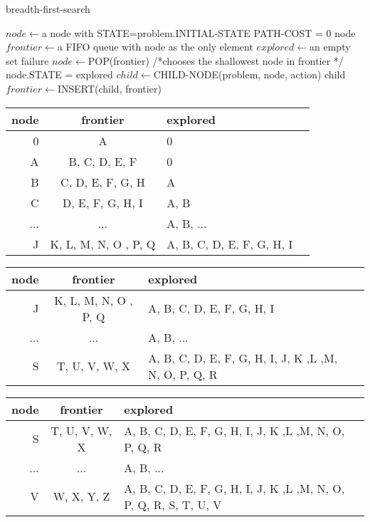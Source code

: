 \documentclass[11pt]{article} %
\begin{document}
\begin{algorithm}
\caption{breadth-first-search }
\begin{algorithmic} 

\STATE $node \leftarrow $a node with STATE=problem.INITIAL-STATE
\STATE PATH-COST = 0
\STATE
\RETURN node
\ENDIF
\STATE $frontier \leftarrow $a FIFO queue with node as the only element
\STATE $explored \leftarrow $an empty set
\LOOP
		\STATE 
		\RETURN failure
	\ENDIF
	\STATE $node \leftarrow $POP(frontier) /*chooses the shallowest node in frontier */
	\STATE node.STATE = explored
	\STATE $child \leftarrow $CHILD-NODE(problem, node, action)
			\STATE
			\RETURN child
		\ENDIF
		\STATE $frontier \leftarrow $INSERT(child, frontier)
	\ENDIF
	\ENDFOR
\ENDLOOP


\end{algorithmic}
\end{algorithm}
\begin{tabularx}{\textwidth}{|r|c|X|X|}
\hline
node & frontier & explored  \\
\hline
0&A&0\\
\hline
A&B, C, D, E, F&0\\
\hline
B&C, D, E, F, G, H&A\\
\hline
C& D, E, F, G, H, I&A, B\\
\hline
...& ...&A, B, ...\\
\hline
J&K, L, M, N, O , P, Q&A, B, C, D, E, F, G, H, I\\
\hline
\end{tabularx}

\begin{tabularx}{\textwidth}{|r|c|X|X|}
\hline
node & frontier & explored  \\
\hline
J&K, L, M, N, O , P, Q&A, B, C, D, E, F, G, H, I\\
\hline
...& ...&A, B, ...\\
\hline
S&T, U, V, W, X&A, B, C, D, E, F, G, H, I, J, K ,L ,M, N, O, P, Q, R\\
\hline
\end{tabularx}

\begin{tabularx}{\textwidth}{|r|c|X|X|}
\hline
node & frontier & explored  \\
\hline
S&T, U, V, W, X&A, B, C, D, E, F, G, H, I, J, K ,L ,M, N, O, P, Q, R\\
\hline
...& ...&A, B, ...\\
\hline
V&W, X, Y, Z&A, B, C, D, E, F, G, H, I, J, K ,L ,M, N, O, P, Q, R, S, T, U, V\\
\hline
\end{tabularx}
\end{document}
